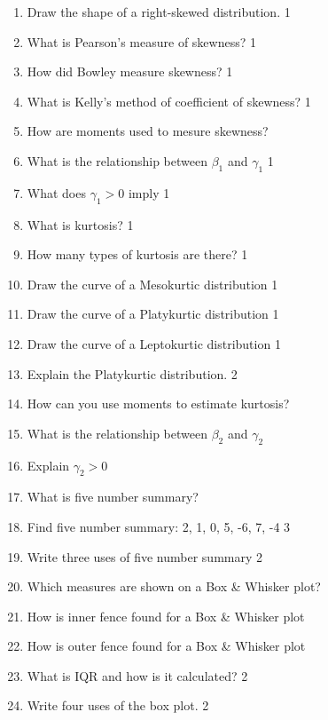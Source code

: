 \documentclass[a4paper,oneside]{book}
\begin{document}
\begin{enumerate}
    \item Draw the shape of a right-skewed distribution.  \hfill 1
    \item What is Pearson's measure of skewness? \hfill 1
    \item How did Bowley measure skewness? \hfill 1
    \item What is Kelly's method of coefficient of skewness? \hfill 1
    \item How are moments used to mesure skewness?
    \item What is the relationship between $\beta_1$ and $\gamma_1$ \hfill 1
    \item What does $\gamma_1>0$ imply \hfill 1
    \item What is kurtosis? \hfill 1
    \item How many types of kurtosis are there? \hfill 1
    \item Draw the curve of a Mesokurtic distribution \hfill 1
    \item Draw the curve of a Platykurtic distribution \hfill 1
    \item Draw the curve of a Leptokurtic distribution \hfill 1
    \item Explain the Platykurtic distribution. \hfill 2
    \item How can you use moments to estimate kurtosis?
    \item What is the relationship between $\beta_2$ and $\gamma_2$
    \item Explain $\gamma_2>0$
    \item What is five number summary?
    \item Find five number summary: 2, 1, 0, 5, -6, 7, -4 \hfill 3
    \item Write three uses of five number summary \hfill 2
    \item Which measures are shown on a Box \& Whisker plot?
    \item How is inner fence found for a Box \& Whisker plot
    \item How is outer fence found for a Box \& Whisker plot
    \item What is IQR and how is it calculated? \hfill 2
    \item Write four uses of the box plot. \hfill 2
    \end{enumerate}
\end{document}
